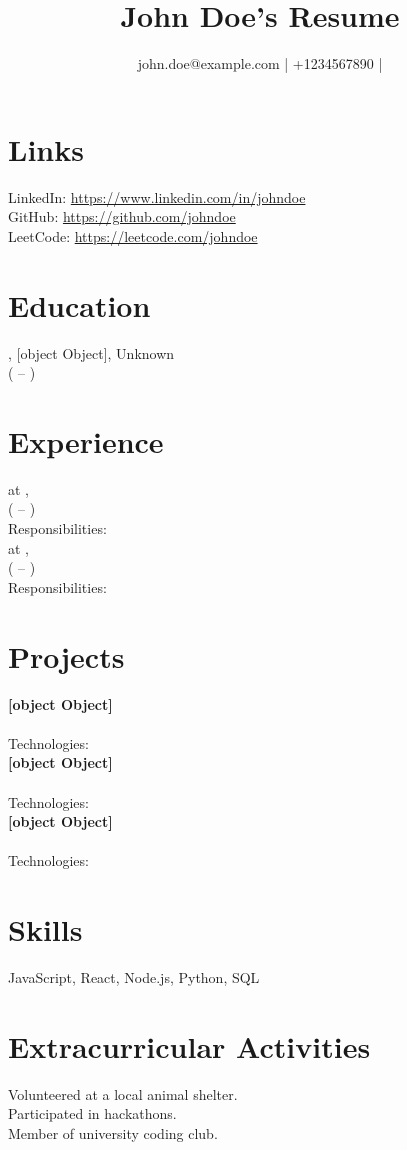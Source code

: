 \documentclass{article}
\begin{document}
        
        \title{John Doe's Resume}
        \author{john.doe@example.com | +1234567890 | }
        \date{}
        \maketitle
        
        \section*{Links}
        LinkedIn: \href{https://www.linkedin.com/in/johndoe}{https://www.linkedin.com/in/johndoe} \\
        GitHub: \href{https://github.com/johndoe}{https://github.com/johndoe} \\
        LeetCode: \href{https://leetcode.com/johndoe}{https://leetcode.com/johndoe} \\
        
        \section*{Education}
        , [object Object], Unknown \\
        ( -- )

        \section*{Experience}
        \textbf{} at ,  \\
        ( -- ) \\
        Responsibilities:  \\
        
        \textbf{} at ,  \\
        ( -- ) \\
        Responsibilities: 

        \section*{Projects}
        \textbf{[object Object]} \\
         \\
        Technologies:  \\
        
        \textbf{[object Object]} \\
         \\
        Technologies:  \\
        
        \textbf{[object Object]} \\
         \\
        Technologies: 

        \section*{Skills}
        JavaScript, React, Node.js, Python, SQL

        \section*{Extracurricular Activities}
        Volunteered at a local animal shelter. \\
        Participated in hackathons. \\
        Member of university coding club.

        
\end{document}

